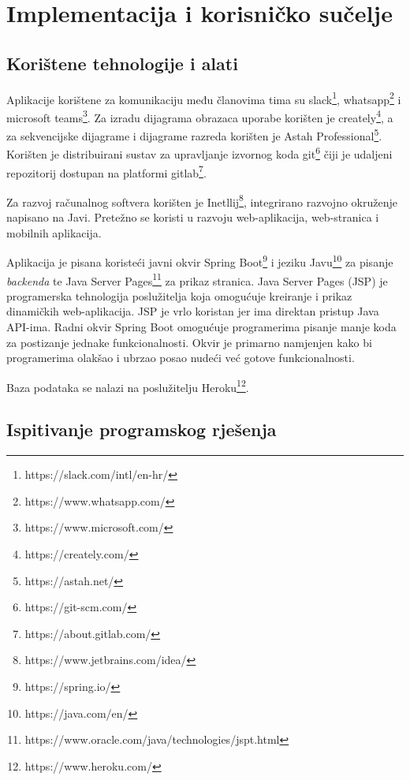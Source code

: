 \chapter{Implementacija i korisničko sučelje}
		
		
		\section{Korištene tehnologije i alati}
		
			 Aplikacije korištene za komunikaciju među članovima tima su slack\footnote{https://slack.com/intl/en-hr/}, whatsapp\footnote{https://www.whatsapp.com/} i microsoft teams\footnote{https://www.microsoft.com/}. Za izradu dijagrama obrazaca uporabe korišten je creately\footnote{https://creately.com/}, a za sekvencijske dijagrame i dijagrame razreda korišten je Astah Professional\footnote{https://astah.net/}. Korišten je distribuirani sustav za upravljanje izvornog koda git\footnote{https://git-scm.com/} čiji je udaljeni repozitorij dostupan na platformi gitlab\footnote{https://about.gitlab.com/}.
			 
			 Za razvoj računalnog softvera korišten je Inetllij\footnote{https://www.jetbrains.com/idea/}, integrirano razvojno okruženje napisano na Javi. Pretežno se koristi u razvoju web-aplikacija, web-stranica i mobilnih aplikacija. 
			 
			 Aplikacija je pisana koristeći javni okvir Spring Boot\footnote{https://spring.io/} i jeziku Javu\footnote{https://java.com/en/} za pisanje \textit{backenda} te Java Server Pages\footnote{https://www.oracle.com/java/technologies/jspt.html} za prikaz stranica. Java Server Pages (JSP) je programerska tehnologija poslužitelja koja omogućuje kreiranje i prikaz dinamičkih web-aplikacija. JSP je vrlo koristan jer ima direktan pristup Java API-ima. Radni okvir Spring Boot omogućuje programerima pisanje manje koda za postizanje jednake funkcionalnosti. Okvir je primarno namjenjen kako bi programerima olakšao i ubrzao posao nudeći već gotove funkcionalnosti.
			 
			 Baza podataka se nalazi na poslužitelju Heroku\footnote{https://www.heroku.com/}.
			 
			 
			 
			 
			
			
			\eject 
		
	
		\section{Ispitivanje programskog rješenja}

